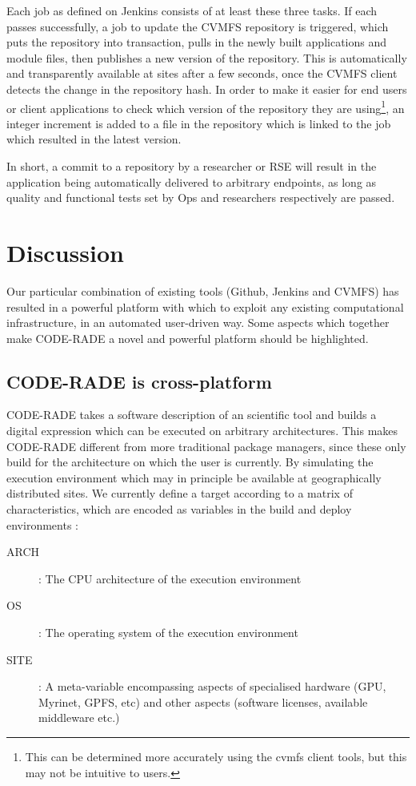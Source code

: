 \documentclass[a4paper]{jpconf}
\begin{document}
Each job as defined on Jenkins consists of at least these three tasks. If each passes successfully, a job to update the CVMFS repository is triggered, which puts the repository into transaction, pulls in the newly built applications and module files, then publishes a new version of the repository. This is automatically and transparently available at sites after a few seconds, once the CVMFS client detects the change in the repository hash. In order to make it easier for end users or client applications to check which version of the repository they are using\footnote{This can be determined more accurately using the cvmfs client tools, but this may not be intuitive to users.}, an integer increment is added to a file in the repository which is linked to the job which resulted in the latest version.

In short, a commit to a repository by a researcher or RSE will result in the application being automatically delivered to arbitrary endpoints, as long as quality and functional tests set by Ops and researchers respectively are passed.

	\section{Discussion}\label{Discussion}

Our particular combination of existing tools (Github, Jenkins and CVMFS) has resulted in a powerful platform with which to exploit any existing computational infrastructure, in an automated user-driven way. Some aspects which together make CODE-RADE a novel and powerful platform should be highlighted.

\subsection{CODE-RADE is cross-platform}

CODE-RADE takes a software description of an scientific tool and builds a digital expression which can be executed on arbitrary architectures. This makes CODE-RADE different from more traditional package managers, since these only build for the architecture on which the user is currently. By simulating the execution environment which may in principle be available at geographically distributed sites. We currently define a target according to a matrix of characteristics, which are encoded as variables in the build and deploy environments :

\begin{description}
	\item[ARCH]: The CPU architecture of the execution environment
	\item[OS]: The operating system of the execution environment
	\item[SITE]: A meta-variable encompassing aspects of specialised hardware (GPU, Myrinet, GPFS, etc) and other aspects (software licenses, available middleware etc.)
\end{description}
\end{document}
